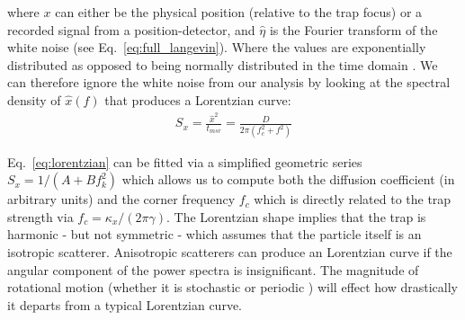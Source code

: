 where $x$ can either be the physical position (relative to the trap
focus) or a recorded signal from a position-detector, and $\hat{\eta}$ 
is the Fourier transform of the white noise (see Eq.~\eqref{eq:full_langevin}). Where the values are exponentially distributed as opposed to being normally distributed in the time 
domain \cite{BergSoerensen2004}. We can therefore ignore the white 
noise from our analysis by looking at the spectral density of $\hat{x}(f)$ that produces a Lorentzian
curve: 
\begin{align}
	\label{eq:lorentzian}
	S_x = \frac{\hat{x}^2}{t_{msr}} = \frac{D}{2\pi(f_c^2+f^2)}
\end{align}
 
Eq.~\eqref{eq:lorentzian} can be fitted via a simplified geometric 
series $S_x = 1/(A+Bf_k^2)$ which allows us to compute both the 
diffusion coefficient (in arbitrary units) and the corner frequency 
$f_c$ which is directly related to the trap strength via $f_c = 
\kappa_x/(2\pi\gamma)$. The Lorentzian shape implies that the trap 
is harmonic - but not symmetric - which assumes that the particle 
itself is an isotropic scatterer. Anisotropic scatterers can 
produce an Lorentzian curve if the angular component of the power
spectra is insignificant. The magnitude of rotational motion 
(whether it is stochastic \cite{Bang2020} or periodic 
\cite{Yogesha2012}) will effect how drastically it departs from a 
typical Lorentzian curve.

